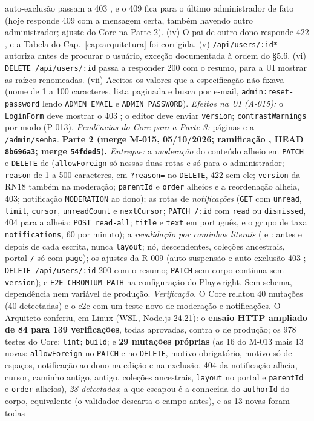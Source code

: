 auto-exclusão passam a 403 , e o 409  fica para o último administrador de fato (hoje responde 409 com a mensagem certa, também havendo outro administrador; ajuste do Core na Parte 2). (iv) O pai de outro dono responde 422 , e a Tabela do Cap.~\ref{cap:arquitetura} foi corrigida. (v) \texttt{/api/users/:id*} autoriza antes de procurar o usuário, exceção documentada à ordem do \S5.6. (vi) \texttt{DELETE /api/users/:id} passa a responder 200 com o resumo, para a UI mostrar as raízes renomeadas. (vii) Aceitos os valores que a especificação não fixava (nome de 1 a 100 caracteres, lista paginada e busca por e-mail, \texttt{admin:reset-password} lendo \texttt{ADMIN\_EMAIL} e \texttt{ADMIN\_PASSWORD}). \emph{Efeitos na UI (A-015):} o \texttt{LoginForm} deve mostrar o 403 ; o editor deve enviar \texttt{version}; \texttt{contrastWarnings} por modo (P-013). \emph{Pendências do Core para a Parte 3:} páginas e a \texttt{/admin/senha}. \textbf{Parte 2 (merge M-015, 05/10/2026; ramificação , HEAD \texttt{8b696a3}; merge \texttt{54fded5}).} \emph{Entregue:} a \emph{moderação} do conteúdo alheio em \texttt{PATCH} e \texttt{DELETE} de  (\texttt{allowForeign} só nessas duas rotas e só para o administrador; \texttt{reason} de 1 a 500 caracteres, em \texttt{?reason=} no \texttt{DELETE}, 422 sem ele; \texttt{version} da RN18 também na moderação; \texttt{parentId} e \texttt{order} alheios e a reordenação alheia, 403; notificação \texttt{MODERATION} ao dono); as rotas de \emph{notificações} (\texttt{GET} com \texttt{unread}, \texttt{limit}, \texttt{cursor}, \texttt{unreadCount} e \texttt{nextCursor}; \texttt{PATCH /:id} com \texttt{read} ou \texttt{dismissed}, 404 para a alheia; \texttt{POST read-all}; \texttt{title} e \texttt{text} em português, e o grupo de taxa \texttt{notifications}, 60 por minuto); a \emph{revalidação por caminhos literais} ( e : antes e depois de cada escrita, nunca \texttt{layout}; nó, descendentes, coleções ancestrais, portal \texttt{/} só com \texttt{page}); os ajustes da R-009 (auto-suspensão e auto-exclusão 403 ; \texttt{DELETE /api/users/:id} 200 com o resumo; \texttt{PATCH} sem corpo continua sem \texttt{version}); e \texttt{E2E\_CHROMIUM\_PATH} na configuração do Playwright. Sem schema, dependência nem variável de produção. \emph{Verificação.} O Core relatou 40 mutações (40 detectadas) e o e2e com um teste novo de moderação e notificações. O Arquiteto conferiu, em Linux (WSL, Node.js 24.21): o \textbf{ensaio HTTP ampliado de 84 para 139 verificações}, todas aprovadas, contra o  de produção; os 978 testes do Core; \texttt{lint}; \texttt{build}; e \textbf{29 mutações próprias} (as 16 do M-013 mais 13 novas: \texttt{allowForeign} no \texttt{PATCH} e no \texttt{DELETE}, motivo obrigatório, motivo só de espaços, notificação ao dono na edição e na exclusão, 404 da notificação alheia, cursor, caminho antigo,  antigo, coleções ancestrais, \texttt{layout} no portal e \texttt{parentId} e \texttt{order} alheios), \emph{28 detectadas}; a que escapou é a conhecida do \texttt{authorId} do corpo, equivalente (o validador descarta o campo antes), e as 13 novas foram todas 